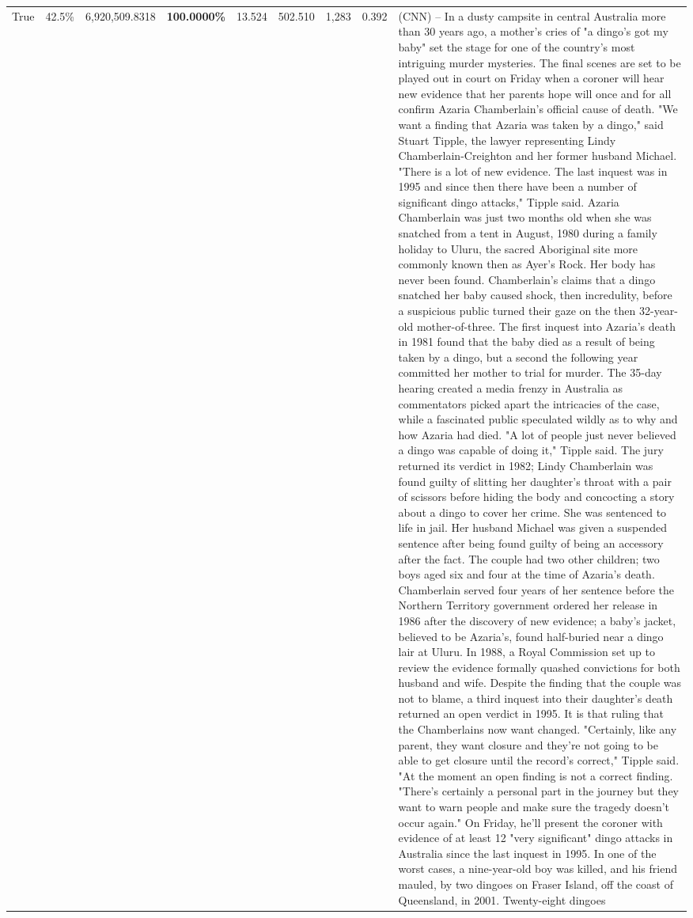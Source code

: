 \begin{table}[H]
\begin{tabular}{lllrlllll}
True & 42.5\% & 6,920,509.8318 & \bfseries \color{red} 100.0000\% & 13.524 & 502.510 & 1,283 & 0.392 & (CNN) -- In a dusty campsite in central Australia more than 30 years ago, a mother's cries of "a dingo's got my baby" set the stage for one of the country's most intriguing murder mysteries. The final scenes are set to be played out in court on Friday when a coroner will hear new evidence that her parents hope will once and for all confirm Azaria Chamberlain's official cause of death. "We want a finding that Azaria was taken by a dingo," said Stuart Tipple, the lawyer representing Lindy Chamberlain-Creighton and her former husband Michael. "There is a lot of new evidence. The last inquest was in 1995 and since then there have been a number of significant dingo attacks," Tipple said. Azaria Chamberlain was just two months old when she was snatched from a tent in August, 1980 during a family holiday to Uluru, the sacred Aboriginal site more commonly known then as Ayer's Rock. Her body has never been found. Chamberlain's claims that a dingo snatched her baby caused shock, then incredulity, before a suspicious public turned their gaze on the then 32-year-old mother-of-three. The first inquest into Azaria's death in 1981 found that the baby died as a result of being taken by a dingo, but a second the following year committed her mother to trial for murder. The 35-day hearing created a media frenzy in Australia as commentators picked apart the intricacies of the case, while a fascinated public speculated wildly as to why and how Azaria had died. "A lot of people just never believed a dingo was capable of doing it," Tipple said. The jury returned its verdict in 1982; Lindy Chamberlain was found guilty of slitting her daughter's throat with a pair of scissors before hiding the body and concocting a story about a dingo to cover her crime. She was sentenced to life in jail. Her husband Michael was given a suspended sentence after being found guilty of being an accessory after the fact. The couple had two other children; two boys aged six and four at the time of Azaria's death. Chamberlain served four years of her sentence before the Northern Territory government ordered her release in 1986 after the discovery of new evidence; a baby's jacket, believed to be Azaria's, found half-buried near a dingo lair at Uluru. In 1988, a Royal Commission set up to review the evidence formally quashed convictions for both husband and wife. Despite the finding that the couple was not to blame, a third inquest into their daughter's death returned an open verdict in 1995. It is that ruling that the Chamberlains now want changed. "Certainly, like any parent, they want closure and they're not going to be able to get closure until the record's correct," Tipple said. "At the moment an open finding is not a correct finding. "There's certainly a personal part in the journey but they want to warn people and make sure the tragedy doesn't occur again." On Friday, he'll present the coroner with evidence of at least 12 "very significant" dingo attacks in Australia since the last inquest in 1995. In one of the worst cases, a nine-year-old boy was killed, and his friend mauled, by two dingoes on Fraser Island, off the coast of Queensland, in 2001. Twenty-eight dingoes 
\end{tabular}
\end{table}
